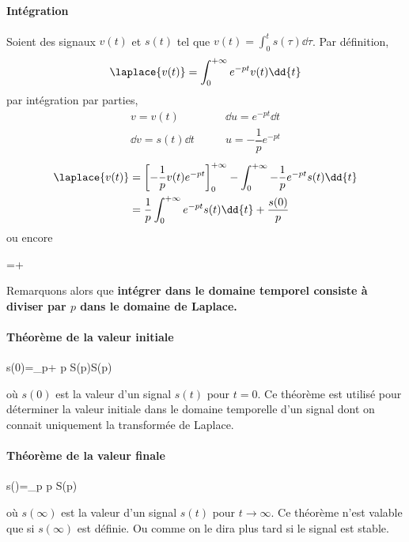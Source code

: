 \paragraph{Intégration}
Soient  des signaux $v(t)$ et $s(t)$ tel que 
$v(t)=\int_{0}^{t}s(\tau)\dd{\tau}$. Par définition,
$$
\laplace{v(t)}=\int_{0}^{+\infty} e^{-pt}v(t)\dd{t}
$$
par intégration par parties,
\begin{align*}
    v=v(t)\qquad&\dd{u}=e^{-pt}\dd{t}\\
    \dd{v}=s(t)\dd{t}\qquad&u=-\dfrac{1}{p}e^{-pt}
\end{align*} 
\begin{align*}
    \laplace{v(t)}&=\left[-\dfrac{1}{p}v(t)e^{-pt}\right]_0^{+\infty}
                          -\int_{0}^{+\infty}
                          -\dfrac{1}{p}e^{-pt}s(t)\dd{t} \\
    &=\dfrac{1}{p}\int_{0}^{+\infty} e^{-pt}s(t)\dd{t}+\dfrac{s(0)}{p}
\end{align*}
ou encore
\begin{bequation}
    =+
\end{bequation}
Remarquons alors que \textbf{intégrer dans le domaine temporel consiste à 
diviser par $p$ dans le domaine de Laplace.}

\paragraph{Théorème de la valeur initiale}
\begin{bequation}
    s(0)=\lim\limits_{p\rightarrow+\infty} p S(p)\qquad \forall S(p)
\end{bequation}
où $s(0)$ est la valeur d'un signal $s(t)$ pour $t=0$.
Ce théorème est utilisé pour déterminer la valeur initiale
dans le domaine temporelle d'un signal dont on connait 
uniquement la transformée de Laplace.

\paragraph{Théorème de la valeur finale}
\begin{bequation}
    s(\infty)=\lim\limits_{p} p S(p)
\end{bequation}
où $s(\infty)$ est la valeur d'un signal $s(t)$ pour $t\to\infty$.
Ce théorème n'est valable que si $s(\infty)$ est définie. Ou comme on le 
dira plus tard si le signal est stable.


